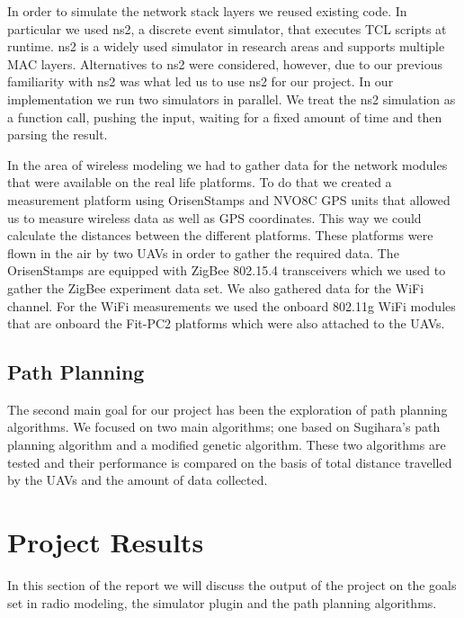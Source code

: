 In order to simulate the network stack layers we reused existing code. In
particular we used ns2, a discrete event simulator, that executes TCL scripts at
runtime. ns2 is a widely used simulator in research areas and supports multiple
MAC layers. Alternatives to ns2 were considered, however, due to our previous
familiarity with ns2 was what led us to use ns2 for our project. In our
implementation we run two simulators in parallel. We treat the ns2 simulation
as a function call, pushing the input, waiting for a fixed amount of time and
then parsing the result.

In the area of wireless modeling we had to gather data for the network modules
that were available on the real life platforms. To do that we created a
measurement platform using OrisenStamps and NVO8C GPS units that allowed us to
measure wireless data as well as GPS coordinates. This way we could calculate
the distances between the different platforms. These platforms were flown in the
air by two UAVs in order to gather the required data. The OrisenStamps are
equipped with ZigBee 802.15.4 transceivers which we used to gather the ZigBee
experiment data set. We also gathered data for the WiFi channel. For the WiFi
measurements we used the onboard 802.11g WiFi modules that are onboard the
Fit-PC2 platforms which were also attached to the UAVs.

\subsection{Path Planning}
The second main goal for our project has been the exploration of path planning
algorithms. We focused on two main algorithms; one based on Sugihara's path
planning algorithm and a modified genetic algorithm. These two algorithms are
tested and their performance is compared on the basis of total distance
travelled by the UAVs and the amount of data collected.

\section{Project Results}
In this section of the report we will discuss the output of the project on the
goals set in radio modeling, the simulator plugin and the path planning
algorithms.


